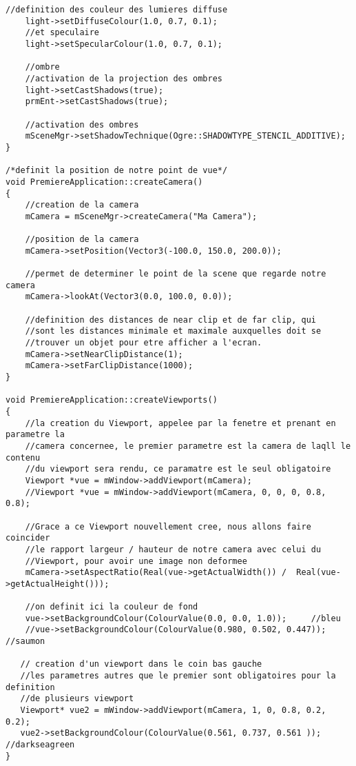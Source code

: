 \begin{lstlisting}[caption={PremiereApplication.cpp}]
    //definition des couleur des lumieres diffuse
    light->setDiffuseColour(1.0, 0.7, 0.1);
    //et speculaire
    light->setSpecularColour(1.0, 0.7, 0.1);

    //ombre
    //activation de la projection des ombres
    light->setCastShadows(true);
    prmEnt->setCastShadows(true);

    //activation des ombres
    mSceneMgr->setShadowTechnique(Ogre::SHADOWTYPE_STENCIL_ADDITIVE);
}

/*definit la position de notre point de vue*/
void PremiereApplication::createCamera()
{
    //creation de la camera
    mCamera = mSceneMgr->createCamera("Ma Camera");

    //position de la camera
    mCamera->setPosition(Vector3(-100.0, 150.0, 200.0));

    //permet de determiner le point de la scene que regarde notre camera
    mCamera->lookAt(Vector3(0.0, 100.0, 0.0));

    //definition des distances de near clip et de far clip, qui
    //sont les distances minimale et maximale auxquelles doit se
    //trouver un objet pour etre afficher a l'ecran.
    mCamera->setNearClipDistance(1);
    mCamera->setFarClipDistance(1000);
}

void PremiereApplication::createViewports()
{
    //la creation du Viewport, appelee par la fenetre et prenant en parametre la
    //camera concernee, le premier parametre est la camera de laqll le contenu
    //du viewport sera rendu, ce paramatre est le seul obligatoire
    Viewport *vue = mWindow->addViewport(mCamera);
    //Viewport *vue = mWindow->addViewport(mCamera, 0, 0, 0, 0.8, 0.8);

    //Grace a ce Viewport nouvellement cree, nous allons faire coincider
    //le rapport largeur / hauteur de notre camera avec celui du
    //Viewport, pour avoir une image non deformee
    mCamera->setAspectRatio(Real(vue->getActualWidth()) /  Real(vue->getActualHeight()));

    //on definit ici la couleur de fond
    vue->setBackgroundColour(ColourValue(0.0, 0.0, 1.0));     //bleu
    //vue->setBackgroundColour(ColourValue(0.980, 0.502, 0.447)); //saumon

   // creation d'un viewport dans le coin bas gauche
   //les parametres autres que le premier sont obligatoires pour la definition
   //de plusieurs viewport
   Viewport* vue2 = mWindow->addViewport(mCamera, 1, 0, 0.8, 0.2, 0.2);
   vue2->setBackgroundColour(ColourValue(0.561, 0.737, 0.561 ));  //darkseagreen
}


\end{lstlisting}






